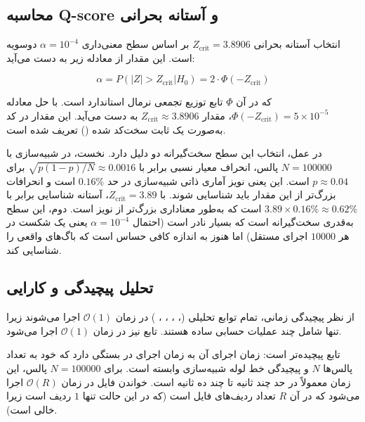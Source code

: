 \subsection{محاسبه Q-score و آستانه بحرانی}

انتخاب آستانه بحرانی $Z_{\text{crit}} = 3.8906$ بر اساس سطح معنی‌داری $\alpha = 10^{-4}$ دوسویه است. این مقدار از معادله زیر به دست می‌آید:

\begin{equation}
	\alpha = P(|Z| > Z_{\text{crit}} | H_0) = 2 \cdot \Phi(-Z_{\text{crit}})
\end{equation}

که در آن $\Phi$ تابع توزیع تجمعی نرمال استاندارد است. با حل معادله $\Phi(-Z_{\text{crit}}) = 5 \times 10^{-5}$، مقدار $Z_{\text{crit}} \approx 3.8906$ به دست می‌آید. این مقدار در کد به‌صورت یک ثابت سخت‌کد شده () تعریف شده است.

در عمل، انتخاب این سطح سخت‌گیرانه دو دلیل دارد. نخست، در شبیه‌سازی  با $N = 100000$ پالس، انحراف معیار نسبی برابر با $\sqrt{p(1-p)/N} \approx 0.0016$ برای $p \approx 0.04$ است. این یعنی نویز آماری ذاتی شبیه‌سازی در حد $0.16\%$ است و انحرافات بزرگ‌تر از این مقدار باید شناسایی شوند. با $Z_{\text{crit}} = 3.89$، آستانه شناسایی برابر با $3.89 \times 0.16\% \approx 0.62\%$ است که به‌طور معناداری بزرگ‌تر از نویز است. دوم، این سطح به‌قدری سخت‌گیرانه است که  بسیار نادر است (احتمال $\alpha = 10^{-4}$ یعنی یک شکست در هر $10000$ اجرای مستقل) اما هنوز به اندازه کافی حساس است که باگ‌های واقعی را شناسایی کند.

\subsection{تحلیل پیچیدگی و کارایی}

از نظر پیچیدگی زمانی، تمام توابع تحلیلی (، ، ، ، ) در زمان $\mathcal{O}(1)$ اجرا می‌شوند زیرا تنها شامل چند عملیات حسابی ساده هستند. تابع  نیز در زمان $\mathcal{O}(1)$ اجرا می‌شود.

تابع  پیچیده‌تر است: زمان اجرای آن به زمان اجرای  در  بستگی دارد که خود به تعداد پالس‌ها $N$ و پیچیدگی خط لوله شبیه‌سازی وابسته است. برای $N = 100000$ پالس، این زمان معمولاً در حد چند ثانیه تا چند ده ثانیه است. خواندن فایل  در زمان $\mathcal{O}(R)$ اجرا می‌شود که در آن $R$ تعداد ردیف‌های فایل است (که در این حالت تنها $1$ ردیف است زیرا  خالی است).

